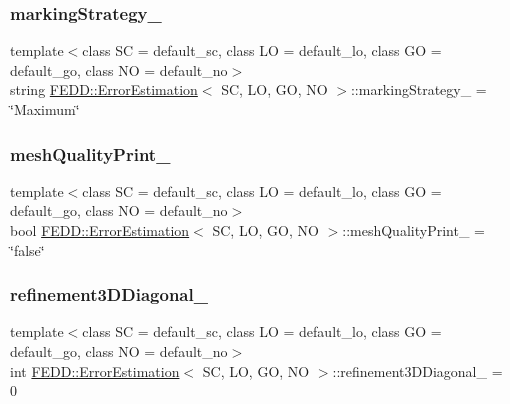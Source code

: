 \subsubsection{\texorpdfstring{marking\+Strategy\+\_\+}{markingStrategy\_}}
{\footnotesize\ttfamily template$<$class SC  = default\+\_\+sc, class LO  = default\+\_\+lo, class GO  = default\+\_\+go, class NO  = default\+\_\+no$>$ \\
string \hyperlink{classFEDD_1_1ErrorEstimation}{F\+E\+D\+D\+::\+Error\+Estimation}$<$ SC, LO, GO, NO $>$\+::marking\+Strategy\+\_\+ = \char`\"{}Maximum\char`\"{}}

\mbox{\label{classFEDD_1_1ErrorEstimation_a2db28f9a5cd90b6bb3abba15ed4ed7f0}} 
\subsubsection{\texorpdfstring{mesh\+Quality\+Print\+\_\+}{meshQualityPrint\_}}
{\footnotesize\ttfamily template$<$class SC  = default\+\_\+sc, class LO  = default\+\_\+lo, class GO  = default\+\_\+go, class NO  = default\+\_\+no$>$ \\
bool \hyperlink{classFEDD_1_1ErrorEstimation}{F\+E\+D\+D\+::\+Error\+Estimation}$<$ SC, LO, GO, NO $>$\+::mesh\+Quality\+Print\+\_\+ = \char`\"{}false\char`\"{}}

\mbox{\label{classFEDD_1_1ErrorEstimation_a3695b55e1703c3c03077bbc17a44fae9}} 
\subsubsection{\texorpdfstring{refinement3\+D\+Diagonal\+\_\+}{refinement3DDiagonal\_}}
{\footnotesize\ttfamily template$<$class SC  = default\+\_\+sc, class LO  = default\+\_\+lo, class GO  = default\+\_\+go, class NO  = default\+\_\+no$>$ \\
int \hyperlink{classFEDD_1_1ErrorEstimation}{F\+E\+D\+D\+::\+Error\+Estimation}$<$ SC, LO, GO, NO $>$\+::refinement3\+D\+Diagonal\+\_\+ = 0}

